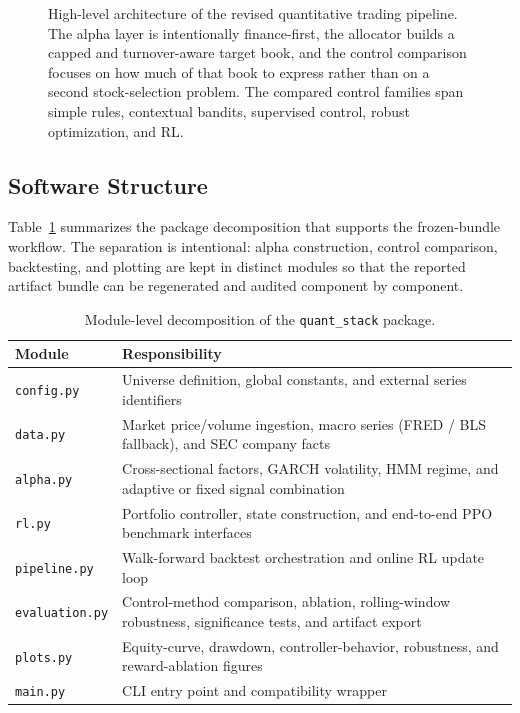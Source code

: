 \documentclass[11pt]{article}
\begin{document}
\begin{figure}[H]
\caption{High-level architecture of the revised quantitative trading pipeline.
The alpha layer is intentionally finance-first, the allocator builds a capped
and turnover-aware target book, and the control comparison focuses on how much
of that book to express rather than on a second stock-selection problem. The
compared control families span simple rules, contextual bandits, supervised
control, robust optimization, and RL.}
\label{fig:architecture}
\end{figure}

\subsection{Software Structure}

Table~\ref{tab:modules} summarizes the package decomposition that supports the
frozen-bundle workflow. The separation is intentional: alpha construction,
control comparison, backtesting, and plotting are kept in distinct modules so
that the reported artifact bundle can be regenerated and audited component by
component.

\begin{table}[H]
\centering
\caption{Module-level decomposition of the \texttt{quant\_stack} package.}
\label{tab:modules}
\begin{tabular}{@{} l p{9.5cm} @{}}
\toprule
\textbf{Module} & \textbf{Responsibility} \\
\midrule
\texttt{config.py}   & Universe definition, global constants, and external series identifiers \\
\texttt{data.py}     & Market price/volume ingestion, macro series (FRED / BLS fallback), and SEC company facts \\
\texttt{alpha.py}    & Cross-sectional factors, GARCH volatility, HMM regime, and adaptive or fixed signal combination \\
\texttt{rl.py}       & Portfolio controller, state construction, and end-to-end PPO benchmark interfaces \\
\texttt{pipeline.py} & Walk-forward backtest orchestration and online RL update loop \\
\texttt{evaluation.py} & Control-method comparison, ablation, rolling-window robustness, significance tests, and artifact export \\
\texttt{plots.py}    & Equity-curve, drawdown, controller-behavior, robustness, and reward-ablation figures \\
\texttt{main.py}     & CLI entry point and compatibility wrapper \\
\bottomrule
\end{tabular}
\end{table}
\end{document}
